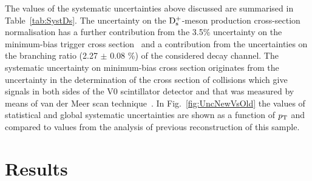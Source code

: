 The values of the systematic uncertainties above discussed are summarised
in Table~\ref{tab:SystDs}. The uncertainty on the ${\rm D_s^+}$-meson production 
cross-section normalisation has a further contribution from the 3.5\%
uncertainty on the minimum-bias trigger cross section~\cite{Abelev:2012sea} 
and a contribution from the uncertainties on the branching ratio (2.27 $\pm$ 0.08 \%)
of the considered decay channel. The systematic uncertainty 
on minimum-bias cross section originates from the uncertainty 
in the determination of the cross section of collisions 
which give signals in both sides of the V0 scintillator detector and 
that was measured by means of van der Meer scan technique~\cite{vanderMeer:296752}.
In Fig.~\ref{fig:UncNewVsOld} the values of statistical and global
systematic uncertainties are shown as a function of $p_{\rm T}$ and compared to values from 
the analysis of previous reconstruction of this sample.  



\section{Results}
